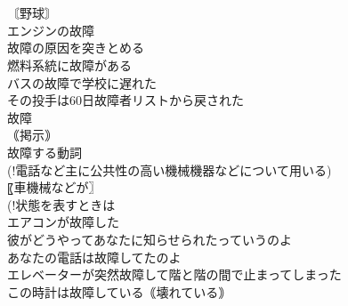 \documentclass[8pt]{extreport}
\begin{document}
\begin{CJK}{UTF8}{min}
\\	[｟英｠ 
\\	(!米英とも 
\\	が普通) 
\\	【出願する】
\\	(!受身可) 
\\	来年は
\\	大学を受験するつもりです
\\	受験科目
\\	受験産業
\\	受験地獄
\\	(!日本語をなぞった直訳なので通例引用符をつける)
\\	受験番号
\\	受験票
\\	【身分証】
\\	【許可証】
\\	受験料
\\	自分で車をなおそうとしたけど、だめだった。
\\	諦めるしかない。
\\	こしょう【故障】名詞
\\	〖機械からだなどの〗
\\	〖機械車などの突然の〗
\\	〖機能停止〗
\\	故障車
\\	[｟やや書｠ 
\\	故障者リストに載る[から復帰する]
\\	〘野球〙
\\	エンジンの故障
\\	故障の原因を突きとめる
\\	燃料系統に故障がある
\\	バスの故障で学校に遅れた
\\	その投手は60日故障者リストから戻された
\\	故障
\\	｟掲示｠
\\	故障する動詞
\\	(!電話など主に公共性の高い機械機器などについて用いる) 
\\	〖車機械などが〗
\\	(!状態を表すときは 
\\	エアコンが故障した
\\	彼がどうやってあなたに知らせられたっていうのよ
\\	あなたの電話は故障してたのよ
\\	エレベーターが突然故障して階と階の間で止まってしまった
\\	この時計は故障している｟壊れている｠

\end{CJK}
\end{document}
